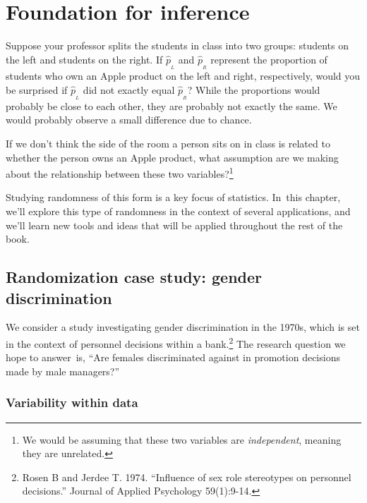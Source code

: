 
\chapter{Foundation for inference}
\label{FoundationForInference}

\begin{example}{Suppose your professor splits the students in class into two groups: students on the left and students on the right. If $\hat{p}_{_L}$ and $\hat{p}_{_R}$ represent the proportion of students who own an Apple product on the left and right, respectively, would you be surprised if $\hat{p}_{_L}$ did not {exactly} equal $\hat{p}_{_R}$?}\label{classRightLeftSideApple}
While the proportions would probably be close to each other, they are probably not exactly the same. We would probably observe a small difference due to {chance}.
\end{example}

\begin{exercise}
If we don't think the side of the room a person sits on in class is related to whether the person owns an Apple product, what assumption are we making about the relationship between these two variables?\footnote{We would be assuming that these two variables are \emph{independent}, meaning they are unrelated.}
\end{exercise}

Studying randomness of this form is a key focus of statistics. In~this chapter, we'll explore this type of randomness in the context of several applications, and we'll learn new tools and ideas that will be applied throughout the rest of the book.



\section{Randomization case study: gender discrimination}
\label{caseStudyGenderDiscrimination}


We consider a study investigating gender discrimination in the 1970s, which is set in the context of personnel decisions within a bank.\footnote{Rosen B and Jerdee T. 1974. ``Influence of sex role stereotypes on personnel decisions.'' Journal of Applied Psychology 59(1):9-14.} The research question we hope to answer~is, ``Are females discriminated against in promotion decisions made by male managers?''

\subsection{Variability within data}
\label{variabilityWithinData}

